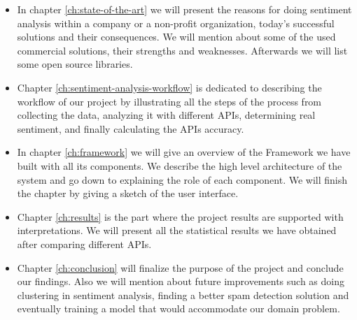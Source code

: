 \begin{itemize}
	\item 
	In  chapter \ref{ch:state-of-the-art}  we will present the reasons for doing sentiment analysis within a company or a non-profit organization, today's successful solutions and their consequences. We will mention about some of the used commercial solutions, their strengths and weaknesses. Afterwards we will list some open source libraries.
	\item 
	Chapter \ref{ch:sentiment-analysis-workflow} is dedicated to describing the workflow of our project by illustrating all the steps of the process from collecting the data, analyzing it with different APIs, determining real sentiment, and finally calculating the APIs accuracy.
	\item 
	In chapter \ref{ch:framework} we will give an overview of the Framework we have built with all its components. We describe the high level architecture of the system and go down to explaining the role of each component. We will finish the chapter by giving a sketch of the user interface.
	\item 
	Chapter \ref{ch:results} is the part where the project results are supported with interpretations. We will present all the statistical results we have obtained after comparing different APIs.
	\item 
	Chapter \ref{ch:conclusion} will finalize the purpose of the project and conclude our findings. Also we will mention about future improvements such as doing clustering in sentiment analysis, finding a better spam detection solution and eventually training a model that would accommodate our domain problem.

\end{itemize}